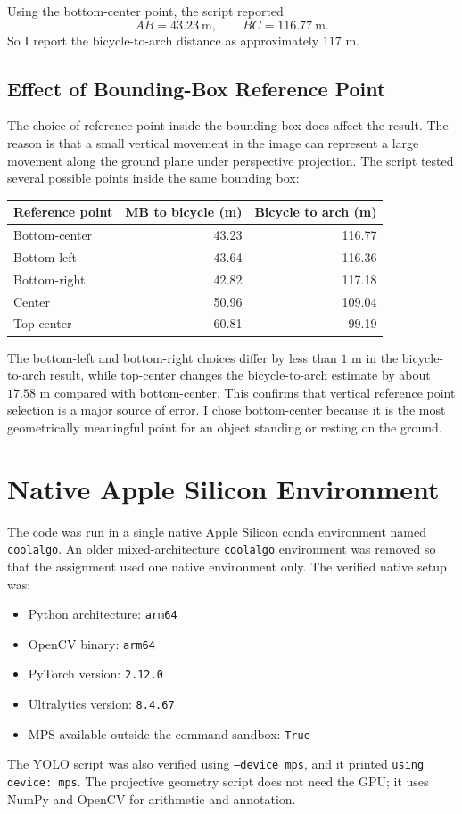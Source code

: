 \documentclass[11pt]{article}
\begin{document}
Using the bottom-center point, the script reported
\[
AB = 43.23\ \text{m},\qquad BC = 116.77\ \text{m}.
\]
So I report the bicycle-to-arch distance as approximately \(117\) m.

\subsection{Effect of Bounding-Box Reference Point}

The choice of reference point inside the bounding box does affect the result. The reason is that a small vertical movement in the image can represent a large movement along the ground plane under perspective projection. The script tested several possible points inside the same bounding box:

\begin{center}
\begin{tabular}{lrr}
\hline
Reference point & MB to bicycle (m) & Bicycle to arch (m) \\
\hline
Bottom-center & 43.23 & 116.77 \\
Bottom-left & 43.64 & 116.36 \\
Bottom-right & 42.82 & 117.18 \\
Center & 50.96 & 109.04 \\
Top-center & 60.81 & 99.19 \\
\hline
\end{tabular}
\end{center}

The bottom-left and bottom-right choices differ by less than \(1\) m in the bicycle-to-arch result, while top-center changes the bicycle-to-arch estimate by about \(17.58\) m compared with bottom-center. This confirms that vertical reference point selection is a major source of error. I chose bottom-center because it is the most geometrically meaningful point for an object standing or resting on the ground.

\section{Native Apple Silicon Environment}

The code was run in a single native Apple Silicon conda environment named \texttt{coolalgo}. An older mixed-architecture \texttt{coolalgo} environment was removed so that the assignment used one native environment only. The verified native setup was:
\begin{itemize}
    \item Python architecture: \texttt{arm64}
    \item OpenCV binary: \texttt{arm64}
    \item PyTorch version: \texttt{2.12.0}
    \item Ultralytics version: \texttt{8.4.67}
    \item MPS available outside the command sandbox: \texttt{True}
\end{itemize}
The YOLO script was also verified using \texttt{--device mps}, and it printed \texttt{using device: mps}. The projective geometry script does not need the GPU; it uses NumPy and OpenCV for arithmetic and annotation.
\end{document}
